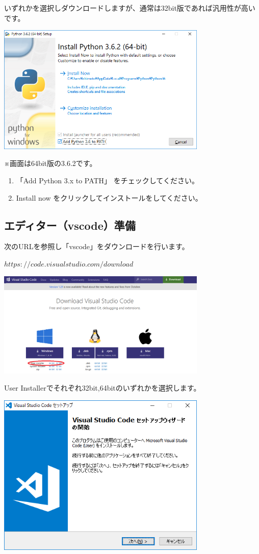 \documentclass[11pt,a4paper,dvipdfmx,titlepage]{jsreport}
\begin{document}
いずれかを選択しダウンロードしますが、通常は32bit版であれば汎用性が高いです。

\includegraphics[width=10cm]{images/image8.png}

※画面は64bit版の3.6.2です。
\begin{enumerate}	
	\item 「Add Python 3.x to PATH」 をチェックしてください。
	\item Install now をクリックしてインストールをしてください。
\end{enumerate}

\subsection{エディター（vscode）準備}

次のURLを参照し「vscode」をダウンロードを行います。

\begin{description}
	\item $https://code.visualstudio.com/download$
\end{description}

\includegraphics[width=10cm]{images/image9.png}

User Installerでそれぞれ32bit,64bitのいずれかを選択します。

\includegraphics[width=10cm]{images/image12.png}
\end{document}
